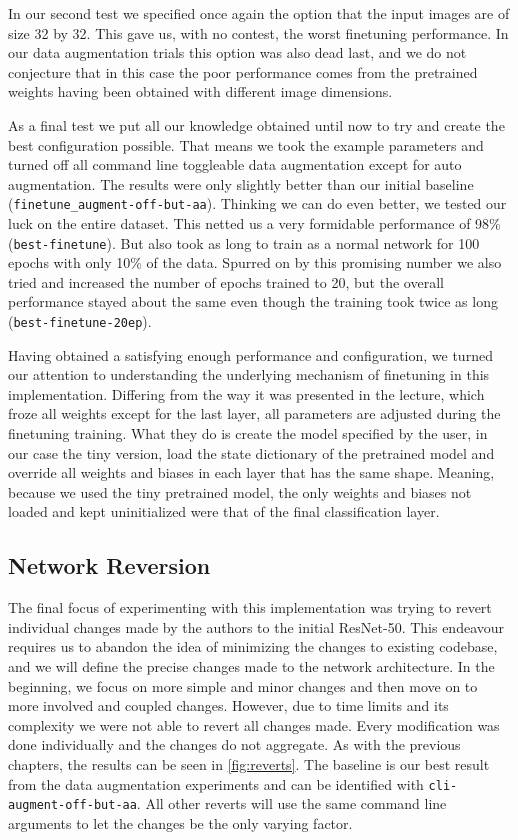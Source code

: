 \documentclass{article}
\begin{document}
    In our second test we specified once again the option that the input images are of size 32 by 32.
    This gave us, with no contest, the worst finetuning performance.
    In our data augmentation trials this option was also dead last, and we do not conjecture that in this case the poor performance comes from the pretrained weights having been obtained with different image dimensions.

    As a final test we put all our knowledge obtained until now to try and create the best configuration possible.
    That means we took the example parameters and turned off all command line toggleable data augmentation except for auto augmentation.
    The results were only slightly better than our initial baseline (\texttt{finetune\_augment-off-but-aa}).
    Thinking we can do even better, we tested our luck on the entire dataset.
    This netted us a very formidable performance of 98\% (\texttt{best-finetune}).
    But also took as long to train as a normal network for 100 epochs with only 10\% of the data.
    Spurred on by this promising number we also tried and increased the number of epochs trained to 20, but the overall performance stayed about the same even though the training took twice as long (\texttt{best-finetune-20ep}).

    Having obtained a satisfying enough performance and configuration, we turned our attention to understanding the underlying mechanism of finetuning in this implementation.
    Differing from the way it was presented in the lecture, which froze all weights except for the last layer, all parameters are adjusted during the finetuning training.
    What they do is create the model specified by the user, in our case the tiny version, load the state dictionary of the pretrained model and override all weights and biases in each layer that has the same shape.
    Meaning, because we used the tiny pretrained model, the only weights and biases not loaded and kept uninitialized were that of the final classification layer.


    \subsection{Network Reversion}\label{subsec:network-reversion}
    The final focus of experimenting with this implementation was trying to revert individual changes made by the authors to the initial ResNet-50.
    This endeavour requires us to abandon the idea of minimizing the changes to existing codebase, and we will define the precise changes made to the network architecture.
    In the beginning, we focus on more simple and minor changes and then move on to more involved and coupled changes.
    However, due to time limits and its complexity we were not able to revert all changes made.
    Every modification was done individually and the changes do not aggregate.
    As with the previous chapters, the results can be seen in \autoref{fig:reverts}.
    The baseline is our best result from the data augmentation experiments and can be identified with \texttt{cli-augment-off-but-aa}.
    All other reverts will use the same command line arguments to let the changes be the only varying factor.
\end{document}
